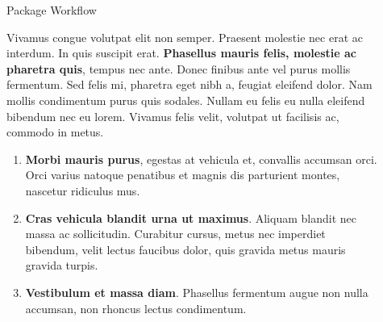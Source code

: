 \documentclass[final]{beamer}
\newlength{\sepwidth}
\newlength{\colwidth}
\newcommand{\separatorcolumn}{\begin{column}{\sepwidth}\end{column}}
\begin{document}
\begin{frame}[t]
\begin{columns}[t]
\begin{column}{\colwidth}



\end{column}

\separatorcolumn

\begin{column}{\colwidth}

  \begin{block}{Package Workflow}

    Vivamus congue volutpat elit non semper. Praesent molestie nec erat ac
    interdum. In quis suscipit erat. \textbf{Phasellus mauris felis, molestie
    ac pharetra quis}, tempus nec ante. Donec finibus ante vel purus mollis
    fermentum. Sed felis mi, pharetra eget nibh a, feugiat eleifend dolor. Nam
    mollis condimentum purus quis sodales. Nullam eu felis eu nulla eleifend
    bibendum nec eu lorem. Vivamus felis velit, volutpat ut facilisis ac,
    commodo in metus.

    \begin{enumerate}
      \item \textbf{Morbi mauris purus}, egestas at vehicula et, convallis
        accumsan orci. Orci varius natoque penatibus et magnis dis parturient
        montes, nascetur ridiculus mus.
      \item \textbf{Cras vehicula blandit urna ut maximus}. Aliquam blandit nec
        massa ac sollicitudin. Curabitur cursus, metus nec imperdiet bibendum,
        velit lectus faucibus dolor, quis gravida metus mauris gravida turpis.
      \item \textbf{Vestibulum et massa diam}. Phasellus fermentum augue non
        nulla accumsan, non rhoncus lectus condimentum.
    \end{enumerate}


\end{block}
\end{column}
\end{columns}
\end{frame}
\end{document}
